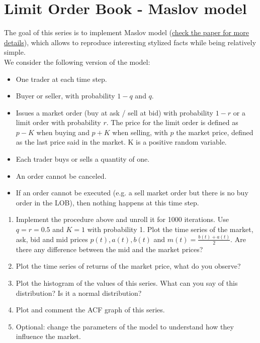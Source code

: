 \section*{Limit Order Book - Maslov model}

The goal of this series is to implement Maslov model (\href{https://arxiv.org/pdf/cond-mat/9910502.pdf}{check the paper for more details}), which allows to reproduce interesting stylized facts while being relatively simple. \\

\noindent We consider the following version of the model:

\begin{itemize}
    \item One trader at each time step.
    \item Buyer or seller, with probability $1 - q$ and $q$.
    \item Issues a market order (buy at ask / sell at bid) with probability $1 - r$ or a limit order with probability $r$. The price for the limit order is defined as $p - K$ when buying and $p + K$ when selling, with $p$ the market price, defined as the last price said in the market. K is a positive random variable.
    \item Each trader buys or sells a quantity of one.
    \item An order cannot be canceled.
    \item If an order cannot be executed (e.g. a sell market order but there is no buy order in the LOB), then nothing happens at this time step.
\end{itemize}

\begin{enumerate}
    \item Implement the procedure above and unroll it for 1000 iterations. Use $q = r = 0.5$ and $K = 1$ with probability 1. Plot the time series of the market, ask, bid and mid prices $p(t), a(t), b(t)$ and $ m(t) = \frac{b(t) + a(t)}{2}$. Are there any difference between the mid and the market prices? 
    \item Plot the time series of returns of the market price, what do you observe?
    \item Plot the histogram of the values of this series. What can you say of this distribution? Is it a normal distribution?
    \item Plot and comment the ACF graph of this series. 
    \item Optional: change the parameters of the model to understand how they influence the market.
\end{enumerate}
